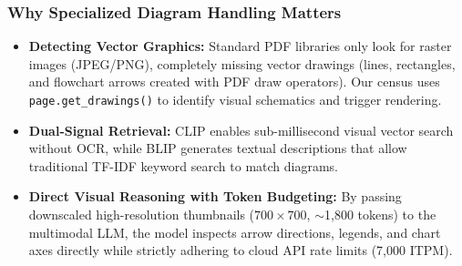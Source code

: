 \documentclass[11pt,a4paper]{article}
\begin{document}
\subsubsection{Why Specialized Diagram Handling Matters}
\begin{itemize}[leftmargin=1.0cm]
\item \textbf{Detecting Vector Graphics:} Standard PDF libraries only look for raster images (JPEG/PNG), completely missing vector drawings (lines, rectangles, and flowchart arrows created with PDF draw operators). Our census uses \texttt{page.get\_drawings()} to identify visual schematics and trigger rendering.
\item \textbf{Dual-Signal Retrieval:} CLIP enables sub-millisecond visual vector search without OCR, while BLIP generates textual descriptions that allow traditional TF-IDF keyword search to match diagrams.
\item \textbf{Direct Visual Reasoning with Token Budgeting:} By passing downscaled high-resolution thumbnails ($700\times700$, $\sim$1,800 tokens) to the multimodal LLM, the model inspects arrow directions, legends, and chart axes directly while strictly adhering to cloud API rate limits (7,000 ITPM).
\end{itemize}
\end{document}
